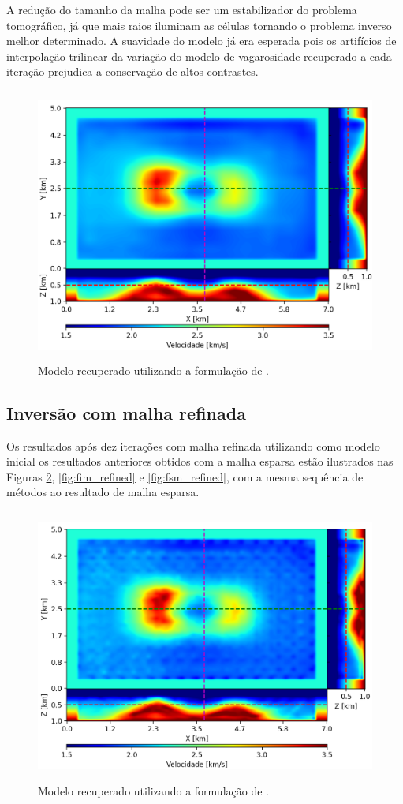 A redução do tamanho da malha pode ser um estabilizador do problema tomográfico, já que mais raios iluminam as células tornando o problema inverso melhor determinado. A suavidade do modelo já era esperada pois os artifícios de interpolação trilinear da variação do modelo de vagarosidade recuperado a cada iteração prejudica a conservação de altos contrastes.     

\begin{figure}[H]
	\centering
	\includegraphics[width=12cm,height=9cm]{Imgs/Resultados/fsm_sparse.png}
	\caption{Modelo recuperado utilizando a formulação de .}
	\label{fig:fsm_sparse}	
\end{figure}

\subsection*{Inversão com malha refinada}

Os resultados após dez iterações com malha refinada utilizando como modelo inicial os resultados anteriores obtidos com a malha esparsa estão ilustrados nas Figuras \ref{fig:pod_refined}, \ref{fig:fim_refined} e \ref{fig:fsm_refined}, com a mesma sequência de métodos ao resultado de malha esparsa.

\begin{figure}[H]
	\centering
	\includegraphics[width=12cm,height=9cm]{Imgs/Resultados/pod_refined.png}
	\caption{Modelo recuperado utilizando a formulação de .}
	\label{fig:pod_refined}	
\end{figure}

